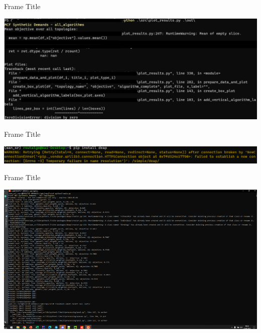 \documentclass[aspectratio=169,10pt]{beamer}
\begin{document}
\begin{frame}{Frame Title}
\begin{center}
    \includegraphics[width=\textwidth]{images/err3.png}
\end{center}
\end{frame}
\begin{frame}{Frame Title}
\begin{center}
    \includegraphics[width=\textwidth]{images/err4.png}
\end{center}
\end{frame}
\begin{frame}{Frame Title}
\begin{center}
    \includegraphics[width=\textwidth]{images/err5.png}
\end{center}
\end{frame}
\end{document}
